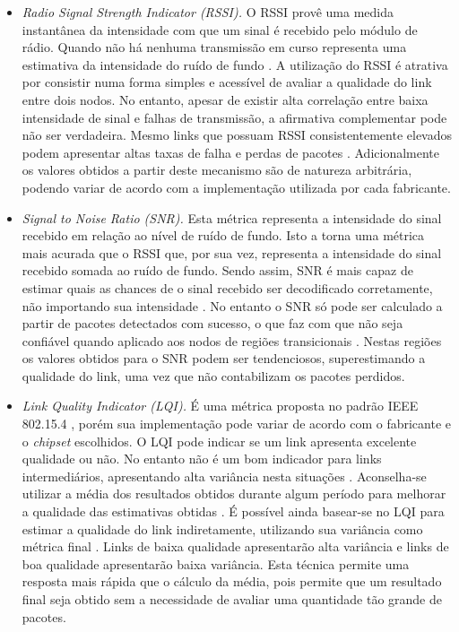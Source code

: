 \documentclass[
	12pt,				%
	openright,			%
	oneside,
	a4paper,			%
	english,			%
	french,				%
	spanish,			%
	brazil				%
	]{abntex2}
\begin{document}
\begin{itemize}
	\item \textit{Radio Signal Strength Indicator (RSSI).} O RSSI provê uma medida instantânea da intensidade com que um sinal é recebido pelo módulo de rádio. Quando não há nenhuma transmissão em curso representa uma estimativa da intensidade do ruído de fundo \cite{Baccour2012}. A utilização do RSSI é atrativa por consistir numa forma simples e acessível de avaliar a qualidade do link entre dois nodos. No entanto, apesar de existir alta correlação entre baixa intensidade de sinal e falhas de transmissão, a afirmativa complementar pode não ser verdadeira. Mesmo links que possuam RSSI consistentemente elevados podem apresentar altas taxas de falha e perdas de pacotes \cite{Srinivasan2006}. Adicionalmente os valores obtidos a partir deste mecanismo são de natureza arbitrária, podendo variar de acordo com a implementação utilizada por cada fabricante.
	\item \textit{Signal to Noise Ratio (SNR).} Esta métrica representa a intensidade do sinal recebido em relação ao nível de ruído de fundo. Isto a torna uma métrica mais acurada que o RSSI que, por sua vez, representa a intensidade do sinal recebido somada ao ruído de fundo. Sendo assim, SNR é mais capaz de estimar quais as chances de o sinal recebido ser decodificado corretamente, não importando sua intensidade \cite{Srinivasan2010}. No entanto o SNR só pode ser calculado a partir de pacotes detectados com sucesso, o que faz com que não seja confiável quando aplicado aos nodos de regiões transicionais \cite{LaI2003}. Nestas regiões os valores obtidos para o SNR podem ser tendenciosos, superestimando a qualidade do link, uma vez que não contabilizam os pacotes perdidos.
	\item \textit{Link Quality Indicator (LQI).} É uma métrica proposta no padrão IEEE 802.15.4 \cite{IEEE2003}, porém sua implementação pode variar de acordo com o fabricante e o \textit{chipset} escolhidos. O LQI pode indicar se um link apresenta excelente qualidade ou não. No entanto não é um bom indicador para links intermediários, apresentando alta variância nesta situações \cite{Baccour2012}. Aconselha-se utilizar a média dos resultados obtidos durante algum período para melhorar a qualidade das estimativas obtidas \cite{Srinivasan2006}. É possível ainda basear-se no LQI para estimar a qualidade do link indiretamente, utilizando sua variância como métrica final \cite{Boano2009}. Links de baixa qualidade apresentarão alta variância e links de boa qualidade apresentarão baixa variância. Esta técnica permite uma resposta mais rápida que o cálculo da média, pois permite que um resultado final seja obtido sem a necessidade de avaliar uma quantidade tão grande de pacotes.
\end{itemize}
	
\end{document}

